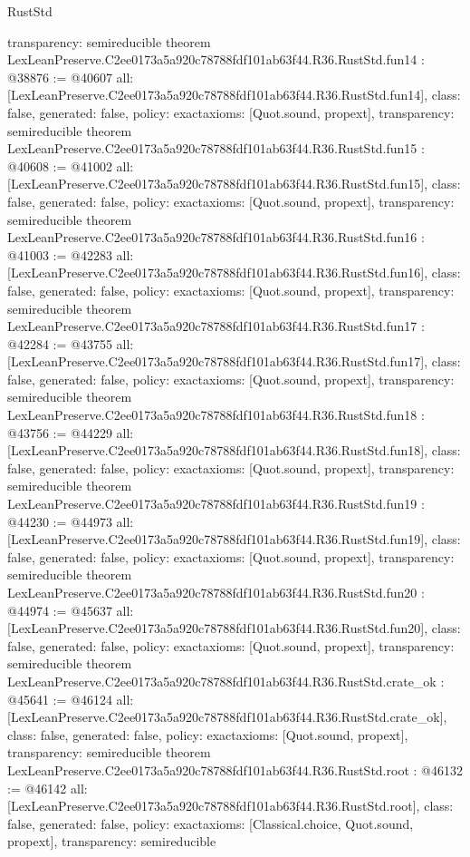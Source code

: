\begin{lexlean}{RustStd}
\begin{coremodule}
{  transparency: semireducible
}
theorem LexLeanPreserve.C2ee0173a5a920c78788fdf101ab63f44.R36.RustStd.fun14 : @38876 := @40607 {
  all: [LexLeanPreserve.C2ee0173a5a920c78788fdf101ab63f44.R36.RustStd.fun14],
  class: false,
  generated: false,
  policy: exact{axioms: [Quot.sound, propext]},
  transparency: semireducible
}
theorem LexLeanPreserve.C2ee0173a5a920c78788fdf101ab63f44.R36.RustStd.fun15 : @40608 := @41002 {
  all: [LexLeanPreserve.C2ee0173a5a920c78788fdf101ab63f44.R36.RustStd.fun15],
  class: false,
  generated: false,
  policy: exact{axioms: [Quot.sound, propext]},
  transparency: semireducible
}
theorem LexLeanPreserve.C2ee0173a5a920c78788fdf101ab63f44.R36.RustStd.fun16 : @41003 := @42283 {
  all: [LexLeanPreserve.C2ee0173a5a920c78788fdf101ab63f44.R36.RustStd.fun16],
  class: false,
  generated: false,
  policy: exact{axioms: [Quot.sound, propext]},
  transparency: semireducible
}
theorem LexLeanPreserve.C2ee0173a5a920c78788fdf101ab63f44.R36.RustStd.fun17 : @42284 := @43755 {
  all: [LexLeanPreserve.C2ee0173a5a920c78788fdf101ab63f44.R36.RustStd.fun17],
  class: false,
  generated: false,
  policy: exact{axioms: [Quot.sound, propext]},
  transparency: semireducible
}
theorem LexLeanPreserve.C2ee0173a5a920c78788fdf101ab63f44.R36.RustStd.fun18 : @43756 := @44229 {
  all: [LexLeanPreserve.C2ee0173a5a920c78788fdf101ab63f44.R36.RustStd.fun18],
  class: false,
  generated: false,
  policy: exact{axioms: [Quot.sound, propext]},
  transparency: semireducible
}
theorem LexLeanPreserve.C2ee0173a5a920c78788fdf101ab63f44.R36.RustStd.fun19 : @44230 := @44973 {
  all: [LexLeanPreserve.C2ee0173a5a920c78788fdf101ab63f44.R36.RustStd.fun19],
  class: false,
  generated: false,
  policy: exact{axioms: [Quot.sound, propext]},
  transparency: semireducible
}
theorem LexLeanPreserve.C2ee0173a5a920c78788fdf101ab63f44.R36.RustStd.fun20 : @44974 := @45637 {
  all: [LexLeanPreserve.C2ee0173a5a920c78788fdf101ab63f44.R36.RustStd.fun20],
  class: false,
  generated: false,
  policy: exact{axioms: [Quot.sound, propext]},
  transparency: semireducible
}
theorem LexLeanPreserve.C2ee0173a5a920c78788fdf101ab63f44.R36.RustStd.crate_ok : @45641 := @46124 {
  all: [LexLeanPreserve.C2ee0173a5a920c78788fdf101ab63f44.R36.RustStd.crate_ok],
  class: false,
  generated: false,
  policy: exact{axioms: [Quot.sound, propext]},
  transparency: semireducible
}
theorem LexLeanPreserve.C2ee0173a5a920c78788fdf101ab63f44.R36.RustStd.root : @46132 := @46142 {
  all: [LexLeanPreserve.C2ee0173a5a920c78788fdf101ab63f44.R36.RustStd.root],
  class: false,
  generated: false,
  policy: exact{axioms: [Classical.choice, Quot.sound, propext]},
  transparency: semireducible
}


\end{coremodule}
\end{lexlean}
